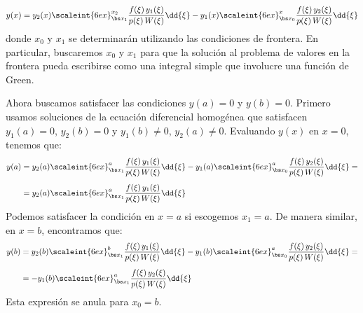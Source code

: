 \begin{align*}
y (x) = y_{2} (x) \scaleint{6ex}_{\bs x_{1}}^{x_{2}} \dfrac{f (\xi) \, y_{1} (\xi)}{p (\xi) \, W (\xi)} \dd{\xi} - y_{1} (x) \scaleint{6ex}_{\bs x_{0}}^{x} \dfrac{f (\xi) \, y_{2} (\xi)}{p (\xi) \, W (\xi)} \dd{\xi}
\end{align*}
donde $x_{0}$ y $x_{1}$ se determinarán utilizando las condiciones de frontera. En particular, buscaremos $x_{0}$ y $x_{1}$ para que la solución al problema de valores en la frontera pueda escribirse como una integral simple que involucre una función de Green. %
\par
Ahora buscamos satisfacer las condiciones $y (a) = 0$ y $y (b) = 0$. Primero usamos soluciones de la ecuación diferencial homogénea que satisfacen $y_{1} (a) = 0$, $y_{2} (b) = 0$ y $y_{1} (b) \neq 0$, $y_{2} (a) \neq 0$. Evaluando $y (x)$ en $x = 0$, tenemos que:
\begin{align}
\begin{aligned}[b]
y (a) &= y_{2} (a) \scaleint{6ex}_{\bs x_{1}}^{a} \dfrac{f (\xi) \, y_{1} (\xi)}{p (\xi) \, W (\xi)} \dd{\xi} - y_{1} (a) \scaleint{6ex}_{\bs x_{0}}^{a} \dfrac{f (\xi) \, y_{2} (\xi)}{p (\xi) \, W (\xi)} \dd{\xi} = \\[0.5em]
&= y_{2} (a) \scaleint{6ex}_{\bs x_{1}}^{a} \dfrac{f (\xi) \, y_{1} (\xi)}{p (\xi) \, W (\xi)} \dd{\xi}
\end{aligned}
\label{eq:ecuacion_07_27}
\end{align}
Podemos satisfacer la condición en $x = a$ si escogemos $x_{1} = a$. De manera similar, en $x = b$, encontramos que:
\begin{align}
\begin{aligned}[b]
y (b) &= y_{2} (b) \scaleint{6ex}_{\bs x_{1}}^{b} \dfrac{f (\xi) \, y_{1} (\xi)}{p (\xi) \, W (\xi)} \dd{\xi} - y_{1} (b) \scaleint{6ex}_{\bs x_{0}}^{a} \dfrac{f (\xi) \, y_{2} (\xi)}{p (\xi) \, W (\xi)} \dd{\xi} = \\[0.5em]
&= - y_{1} (b) \scaleint{6ex}_{\bs x_{1}}^{a} \dfrac{f (\xi) \, y_{2} (\xi)}{p (\xi) \, W (\xi)} \dd{\xi}
\end{aligned}
\label{eq:ecuacion_07_28}
\end{align}
Esta expresión se anula para $x_{0} = b$.

